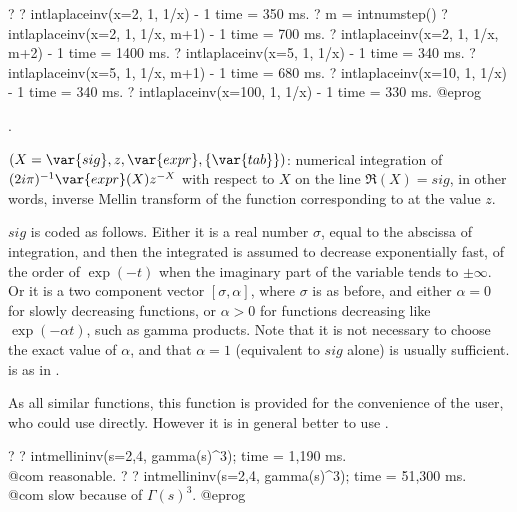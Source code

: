 \bprog
? 
? intlaplaceinv(x=2, 1, 1/x) - 1
time = 350 ms.
? m = intnumstep()
? intlaplaceinv(x=2, 1, 1/x, m+1) - 1
time = 700 ms.
? intlaplaceinv(x=2, 1, 1/x, m+2) - 1
time = 1400 ms.
? intlaplaceinv(x=5, 1, 1/x) - 1
time = 340 ms.
? intlaplaceinv(x=5, 1, 1/x, m+1) - 1
time = 680 ms.
? intlaplaceinv(x=10, 1, 1/x) - 1
time = 340 ms.
? intlaplaceinv(x=100, 1, 1/x) - 1
time = 330 ms.
@eprog

.

$(X=\var{sig},z,\var{expr},\{\var{tab}\})$: \label{se:intmellininv}numerical
integration of $(2i\pi)^{-1}\var{expr}(X)z^{-X}$ with respect to $X$ on the
line $\Re(X)=sig$,  in other words, inverse Mellin transform of
the function corresponding to  at the value $z$.

$sig$ is coded as follows. Either it is a real number $\sigma$, equal to the
abscissa of integration, and then the integrated is assumed to decrease
exponentially fast, of the order of $\exp(-t)$ when the imaginary part of the
variable tends to $\pm\infty$. Or it is a two component vector
$[\sigma,\alpha]$, where $\sigma$ is as before, and either $\alpha=0$ for
slowly decreasing functions, or $\alpha>0$ for functions decreasing like
$\exp(-\alpha t)$, such as gamma products. Note that it is not necessary to
choose the exact value of $\alpha$, and that $\alpha=1$ (equivalent to $sig$
alone) is usually sufficient.  is as in .

As all similar functions, this function is provided for the convenience of
the user, who could use  directly. However it is in general
better to use .

\bprog
? 
? intmellininv(s=2,4, gamma(s)^3);
time = 1,190 ms. \\@com reasonable.
? 
? intmellininv(s=2,4, gamma(s)^3);
time = 51,300 ms. \\@com slow because of $\Gamma(s)^3$.
@eprog\noindent

